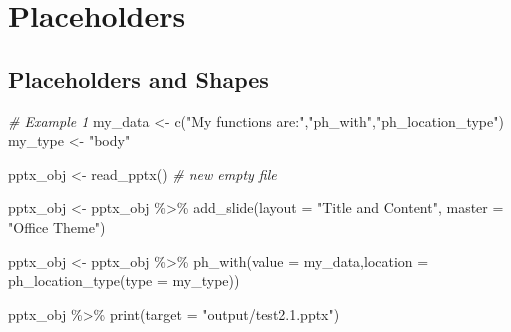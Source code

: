 \documentclass[
]{book}
\newenvironment{Shaded}{\begin{snugshade}}{\end{snugshade}}
\newcommand{\AttributeTok}[1]{\textcolor[rgb]{0.77,0.63,0.00}{#1}}
\newcommand{\CommentTok}[1]{\textcolor[rgb]{0.56,0.35,0.01}{\textit{#1}}}
\newcommand{\FunctionTok}[1]{\textcolor[rgb]{0.00,0.00,0.00}{#1}}
\newcommand{\NormalTok}[1]{#1}
\newcommand{\OtherTok}[1]{\textcolor[rgb]{0.56,0.35,0.01}{#1}}
\newcommand{\SpecialCharTok}[1]{\textcolor[rgb]{0.00,0.00,0.00}{#1}}
\newcommand{\StringTok}[1]{\textcolor[rgb]{0.31,0.60,0.02}{#1}}
\begin{document}
\hypertarget{placeholders}{%
\section{Placeholders}\label{placeholders}}

\hypertarget{placeholders-and-shapes}{%
\subsection{Placeholders and Shapes}\label{placeholders-and-shapes}}

\begin{Shaded}
\begin{Highlighting}[]
\CommentTok{\# Example 1}
\NormalTok{my\_data }\OtherTok{\textless{}{-}} \FunctionTok{c}\NormalTok{(}\StringTok{"My functions are:"}\NormalTok{,}\StringTok{"ph\_with"}\NormalTok{,}\StringTok{"ph\_location\_type"}\NormalTok{)}
\NormalTok{my\_type }\OtherTok{\textless{}{-}} \StringTok{"body"}

\NormalTok{pptx\_obj }\OtherTok{\textless{}{-}} \FunctionTok{read\_pptx}\NormalTok{() }\CommentTok{\# new empty file}

\NormalTok{pptx\_obj }\OtherTok{\textless{}{-}}\NormalTok{ pptx\_obj }\SpecialCharTok{\%\textgreater{}\%} 
  \FunctionTok{add\_slide}\NormalTok{(}\AttributeTok{layout =} \StringTok{"Title and Content"}\NormalTok{, }\AttributeTok{master =} \StringTok{"Office Theme"}\NormalTok{)}

\NormalTok{pptx\_obj }\OtherTok{\textless{}{-}}\NormalTok{ pptx\_obj }\SpecialCharTok{\%\textgreater{}\%}
  \FunctionTok{ph\_with}\NormalTok{(}\AttributeTok{value =}\NormalTok{ my\_data,}\AttributeTok{location =} \FunctionTok{ph\_location\_type}\NormalTok{(}\AttributeTok{type =}\NormalTok{ my\_type))}

\NormalTok{pptx\_obj }\SpecialCharTok{\%\textgreater{}\%}
  \FunctionTok{print}\NormalTok{(}\AttributeTok{target =} \StringTok{"output/test2.1.pptx"}\NormalTok{) }
\end{Highlighting}
\end{Shaded}
\end{document}
